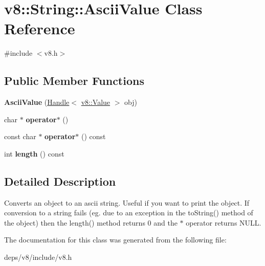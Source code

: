 \hypertarget{classv8_1_1_string_1_1_ascii_value}{}\section{v8\+:\+:String\+:\+:Ascii\+Value Class Reference}
\label{classv8_1_1_string_1_1_ascii_value}


{\ttfamily \#include $<$v8.\+h$>$}

\subsection*{Public Member Functions}
\begin{DoxyCompactItemize}
\item 
\hypertarget{classv8_1_1_string_1_1_ascii_value_a57cc7956658fe389a7232d4843caf3d0}{}{\bfseries Ascii\+Value} (\hyperlink{classv8_1_1_handle}{Handle}$<$ \hyperlink{classv8_1_1_value}{v8\+::\+Value} $>$ obj)\label{classv8_1_1_string_1_1_ascii_value_a57cc7956658fe389a7232d4843caf3d0}

\item 
\hypertarget{classv8_1_1_string_1_1_ascii_value_a1e08f3a11aefee28cbbcbc386afd6032}{}char $\ast$ {\bfseries operator$\ast$} ()\label{classv8_1_1_string_1_1_ascii_value_a1e08f3a11aefee28cbbcbc386afd6032}

\item 
\hypertarget{classv8_1_1_string_1_1_ascii_value_abb007f038d674706da738f1f1f01f084}{}const char $\ast$ {\bfseries operator$\ast$} () const \label{classv8_1_1_string_1_1_ascii_value_abb007f038d674706da738f1f1f01f084}

\item 
\hypertarget{classv8_1_1_string_1_1_ascii_value_a97cccf0ed40a3deda1612c235b2f8068}{}int {\bfseries length} () const \label{classv8_1_1_string_1_1_ascii_value_a97cccf0ed40a3deda1612c235b2f8068}

\end{DoxyCompactItemize}


\subsection{Detailed Description}
Converts an object to an ascii string. Useful if you want to print the object. If conversion to a string fails (eg. due to an exception in the to\+String() method of the object) then the length() method returns 0 and the $\ast$ operator returns N\+U\+L\+L. 

The documentation for this class was generated from the following file\+:\begin{DoxyCompactItemize}
\item 
deps/v8/include/v8.\+h\end{DoxyCompactItemize}

